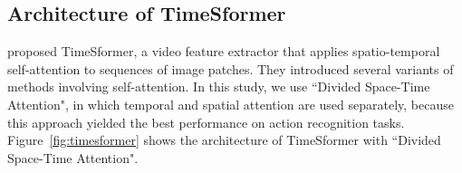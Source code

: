 \documentclass[letterpaper]{article} %
\begin{document}
% 

\subsection{Architecture of TimeSformer}
\citet{Bertasius2021is} proposed TimeSformer, a video feature extractor that applies spatio-temporal self-attention to sequences of image patches.
They introduced several variants of methods involving self-attention.
In this study, we use ``Divided Space-Time Attention", in which temporal and spatial attention are used separately, because this approach yielded the best performance on action recognition tasks.
Figure~\ref{fig:timesformer} shows the architecture of TimeSformer with ``Divided Space-Time Attention".
\end{document}
